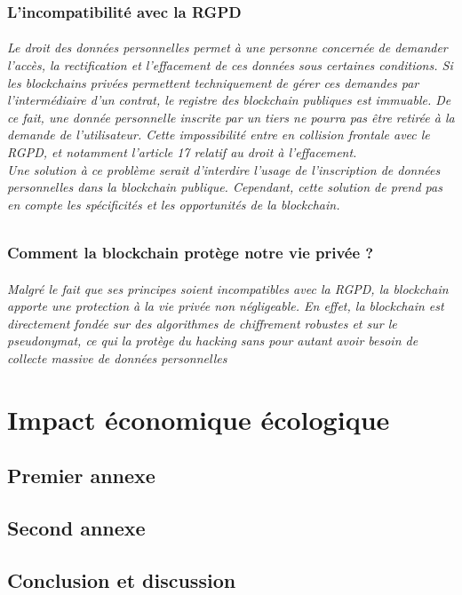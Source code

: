 \documentclass[12pt, a4paper, oneside]{book}
\begin{document}
    \section{L'incompatibilité avec la RGPD}
    \paragraph{Le droit des données personnelles permet 
    à une personne concernée de demander l’accès, la rectification 
    et l’effacement de ces données sous certaines conditions. 
    Si les blockchains privées permettent techniquement de gérer
    ces demandes par l’intermédiaire d’un contrat,
    le registre des blockchain publiques est immuable. De ce fait,
    une donnée personnelle inscrite par un tiers ne pourra pas être retirée 
    à la demande de l’utilisateur. Cette impossibilité entre en collision frontale avec le RGPD, 
    et notamment l’article 17 relatif au droit à l’effacement. 
    \\ 
    \newline
    Une solution à ce problème serait d'interdire l'usage de l'inscription de données personnelles dans la blockchain publique. 
    Cependant, cette solution de prend pas en compte les spécificités et les opportunités de la blockchain.
    }

    \section{Comment la blockchain protège notre vie privée ?}
    \paragraph{Malgré le fait que ses principes 
     soient incompatibles avec la RGPD, la blockchain apporte une protection à la vie privée non négligeable. 
     En effet, la blockchain est directement fondée sur des algorithmes de chiffrement robustes et sur le pseudonymat,
     ce qui la protège du hacking sans pour autant avoir besoin de collecte massive de données personnelles}

    \part{Impact économique écologique}
 
    \appendix
 
    \chapter{Premier annexe}
    \chapter{Second annexe}
 
    
    \backmatter
 
    \chapter{Conclusion et discussion}
 
    
    \tableofcontents

    
    
 
\end{document}
